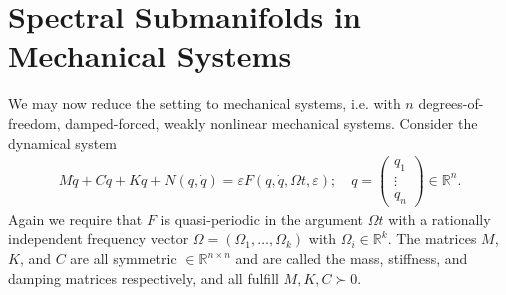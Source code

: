 \section{Spectral Submanifolds in Mechanical Systems}
We may now reduce the setting to mechanical systems, i.e. with $n$ degrees-of-freedom, damped-forced, weakly  nonlinear mechanical systems. Consider the dynamical system
\begin{align} \label{eq9:mech_ssm}
	M \ddot{q} + C \dot{q} + K q + N(q, \dot{q}) = \varepsilon F(q, \dot{q}, \Omega t, \varepsilon);\quad q = 
	\begin{pmatrix}
		q_1 \\ \vdots \\q_n
	\end{pmatrix} \in \mathbb{R}^{n}.
\end{align}
Again we require that $F$ is quasi-periodic in the argument $\Omega t$ with a rationally independent frequency vector $\Omega = (\Omega_1, \ldots, \Omega_k)$ with $\Omega_i\in\mathbb{R}^k$. The matrices $M$, $K$, and $C$ are all symmetric $\in \mathbb{R}^{n\times n}$ and are called the mass, stiffness, and damping matrices respectively, and all fulfill $M,K,C \succ 0$. 

